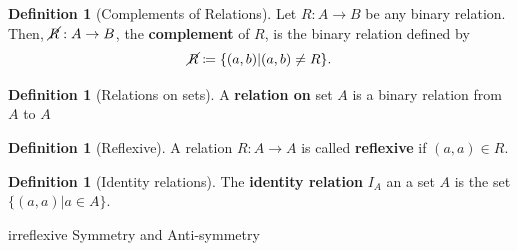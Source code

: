 \documentclass[12pt,a4paper]{report}
\theoremstyle{definition}
\newtheorem{definition}[theorem]{Definition}
\theoremstyle{remark}
\begin{document}
\begin{definition}[Complements of Relations]
    Let $R: A \to B$ be any binary relation. Then, $\cancel R: A \to B$, the \textbf{complement} of $R$, is the binary relation defined by
    \[\cancel{R} \coloneq \{(a, b)|(a, b) \neq R\}.\]
\end{definition}

\begin{definition}[Relations on sets]
    A \textbf{relation on} set $A$ is a binary relation from $A$ to $A$
\end{definition}

\begin{definition}[Reflexive]
    A relation $R: A \to A$ is called \textbf{reflexive} if $(a, a) \in R$.
\end{definition}

\begin{definition}[Identity relations]
    The \textbf{identity relation} $I_A$ an a set $A$ is the set $\{(a, a)|a \in A\}.$
\end{definition}

irreflexive Symmetry and Anti-symmetry
\end{document}
